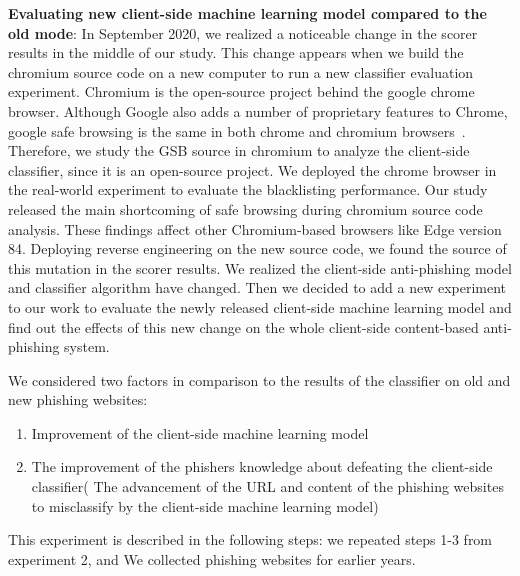 \textbf{Evaluating new client-side machine learning model compared to the old mode}:
In September 2020, we realized a noticeable change in the scorer results in the middle of our study. This change appears when we build the chromium source code on a new computer to run a new classifier evaluation experiment.
Chromium is the open-source project behind the google chrome browser. Although Google also adds a number of proprietary features to Chrome, google safe browsing is the same in both chrome and chromium browsers~\cite{the-chromium-projects}. Therefore, we study the GSB source in chromium to analyze the client-side classifier, since it is an open-source project. We deployed the chrome browser in the real-world experiment to evaluate the blacklisting performance. Our study released the main shortcoming of safe browsing during chromium source code analysis. These findings affect other Chromium-based browsers like  Edge version 84.
Deploying reverse engineering on the new source code, we found the source of this mutation in the scorer results. We realized the client-side anti-phishing model and classifier algorithm have changed. Then we decided to add a new experiment to our work to evaluate the newly released client-side machine learning model and find out the effects of this new change on the whole client-side content-based anti-phishing system. 

We considered two factors in comparison to the results of the classifier on old and new phishing websites:
\begin{enumerate}
    \item Improvement of the client-side machine learning model
    \item The improvement of the phishers knowledge about defeating the client-side classifier( The advancement of the URL and content of the phishing websites to misclassify by the client-side machine learning model)
\end{enumerate}

This experiment is described in the following steps: we repeated steps 1-3 from experiment 2, and We collected phishing websites for earlier years.

